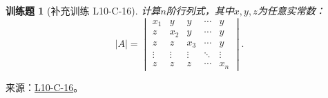 \documentclass[12pt,fontset=fandol]{ctexart}
\newtheorem{exercise}{训练题}[section]
\begin{document}
\begin{exercise}[补充训练 L10-C-16]\label{prob:L10-C-16}
计算$n$阶行列式，其中$x,y,z$为任意实常数：
        \[|A|=\begin{vmatrix}
                x_1    & y      & y      & \cdots & y      \\
                z      & x_2    & y      & \cdots & y      \\
                z      & z      & x_3    & \cdots & y      \\
                \vdots & \vdots & \vdots & \ddots & \vdots \\
                z      & z      & z      & \cdots & x_n
            \end{vmatrix}.\]
\end{exercise}
\noindent 来源：\href{https://github.com/yhwu-is/Linear-Algebra-Left-Undone/blob/new/%E8%AE%B2%E4%B9%89/%E4%B8%93%E9%A2%98/10%20%E8%A1%8C%E5%88%97%E5%BC%8F.tex}{L10-C-16}。
\end{document}
